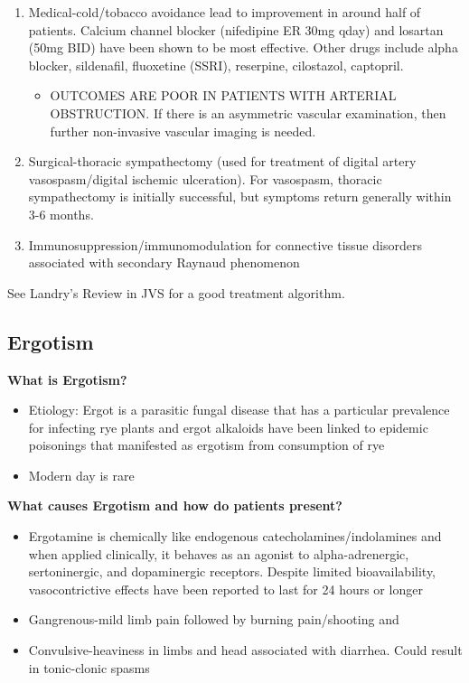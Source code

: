 \documentclass[
]{book}
\providecommand{\tightlist}{%
  \setlength{\itemsep}{0pt}\setlength{\parskip}{0pt}}
\begin{document}
\begin{enumerate}
\def\labelenumi{\arabic{enumi}.}
\item
  Medical-cold/tobacco avoidance lead to improvement in around half of
  patients. Calcium channel blocker (nifedipine ER 30mg qday) and
  losartan (50mg BID) have been shown to be most
  effective.\citep{landry2013, wigley2016} Other drugs include alpha
  blocker, sildenafil, fluoxetine (SSRI), reserpine, cilostazol,
  captopril.

  \begin{itemize}
  \tightlist
  \item
    OUTCOMES ARE POOR IN PATIENTS WITH ARTERIAL OBSTRUCTION. If
    there is an asymmetric vascular examination, then further
    non-invasive vascular imaging is needed.
  \end{itemize}
\item
  Surgical-thoracic sympathectomy (used for treatment of digital
  artery vasospasm/digital ischemic ulceration). For vasospasm,
  thoracic sympathectomy is initially successful, but symptoms return
  generally within 3-6 months.
\item
  Immunosuppression/immunomodulation for connective tissue disorders
  associated with secondary Raynaud phenomenon
\end{enumerate}

See Landry's Review in JVS for a good treatment algorithm.\citep{landry2013}

\hypertarget{ergotism}{%
\subsection{Ergotism}\label{ergotism}}

\textbf{What is Ergotism?} \citep{jamescstanleyCurrentTherapyVascular2014}

\begin{itemize}
\item
  Etiology: Ergot is a parasitic fungal disease that has a particular
  prevalence for infecting rye plants and ergot alkaloids have been
  linked to epidemic poisonings that manifested as ergotism from
  consumption of rye
\item
  Modern day is rare
\end{itemize}

\textbf{What causes Ergotism and how do patients present?}

\begin{itemize}
\item
  Ergotamine is chemically like endogenous catecholamines/indolamines
  and when applied clinically, it behaves as an agonist to
  alpha-adrenergic, sertoninergic, and dopaminergic receptors. Despite
  limited bioavailability, vasocontrictive effects have been reported
  to last for 24 hours or longer
\item
  Gangrenous-mild limb pain followed by burning pain/shooting and
\item
  Convulsive-heaviness in limbs and head associated with diarrhea.
  Could result in tonic-clonic spasms
\end{itemize}
\end{document}
